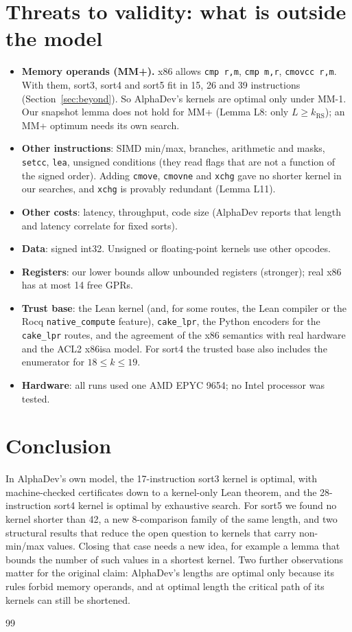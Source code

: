 \documentclass[11pt]{article}
\theoremstyle{remark}\newtheorem{remark}[theorem]{Remark}
\begin{document}
\section{Threats to validity: what is outside the model}\label{sec:threats}
\begin{itemize}
\item \textbf{Memory operands (MM+).} x86 allows \texttt{cmp r,m}, \texttt{cmp m,r}, \texttt{cmovcc r,m}. With them, sort3, sort4
and sort5 fit in 15, 26 and 39 instructions (Section~\ref{sec:beyond}). So AlphaDev's kernels are optimal only under MM-1. Our
snapshot lemma does not hold for MM+ (Lemma L8: only $L \ge k_{\mathrm{RS}}$); an MM+ optimum needs its own search.
\item \textbf{Other instructions}: SIMD min/max, branches, arithmetic and masks, \texttt{setcc}, \texttt{lea}, unsigned
conditions (they read flags that are not a function of the signed order). Adding \texttt{cmove}, \texttt{cmovne} and
\texttt{xchg} gave no shorter kernel in our searches, and \texttt{xchg} is provably redundant (Lemma L11).
\item \textbf{Other costs}: latency, throughput, code size (AlphaDev reports that length and latency correlate for fixed sorts).
\item \textbf{Data}: signed int32. Unsigned or floating-point kernels use other opcodes.
\item \textbf{Registers}: our lower bounds allow unbounded registers (stronger); real x86 has at most 14 free GPRs.
\item \textbf{Trust base}: the Lean kernel (and, for some routes, the Lean compiler or the Rocq \texttt{native\_\-compute}
feature),
\texttt{cake\_lpr}, the Python encoders for the \texttt{cake\_lpr} routes, and the agreement of the x86 semantics with real
hardware and the ACL2 x86isa model. For sort4 the trusted base also includes the enumerator for $18 \le k \le 19$.
\item \textbf{Hardware}: all runs used one AMD EPYC 9654; no Intel processor was tested.
\end{itemize}



\section{Conclusion}
In AlphaDev's own model, the 17-instruction sort3 kernel is optimal, with machine-checked certificates down to a kernel-only Lean
theorem, and the 28-instruction sort4 kernel is optimal by exhaustive search. For sort5 we found no kernel shorter than 42, a new
8-comparison family of the same length, and two structural results that reduce the open question to kernels that carry
non-min/max values. Closing that case needs a new idea, for example a lemma that bounds the number of such values in a
shortest kernel. Two further observations matter for the original claim: AlphaDev's lengths are optimal only because its rules
forbid memory operands, and at optimal length the critical path of its kernels can still be shortened.

\appendix


\begin{thebibliography}{99}

\end{thebibliography}
\end{document}

